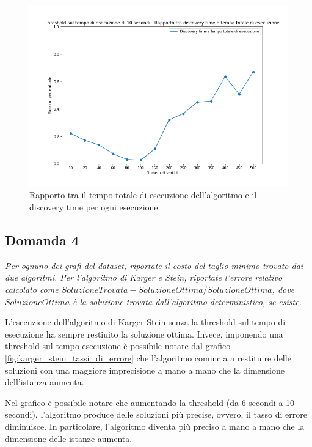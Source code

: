 \begin{figure}[H]
	\centering
	\includegraphics[width=1\textwidth]{res/images/single/karger-stein/discovery-time/threshold10/karger_stein_rapporto_discovery_time_total_time_threshold_10s.png}
	\caption{Rapporto tra il tempo totale di esecuzione dell'algoritmo 
	e il discovery time per ogni esecuzione.}
	\label{fig:karger_stein_rapporto_discovery_time_total_time_threshold_10s}
\end{figure}

\subsection{Domanda 4}
\textit{Per ognuno dei grafi del dataset, riportate il costo del taglio minimo trovato dai due algoritmi. Per l'algoritmo di Karger e Stein, riportate l'errore relativo calcolato come $SoluzioneTrovata-SoluzioneOttima/SoluzioneOttima$, dove $SoluzioneOttima$ è la soluzione trovata dall'algoritmo deterministico, se esiste.}

L'esecuzione dell'algoritmo di Karger-Stein senza la threshold sul 
tempo di esecuzione ha sempre restiuito la soluzione ottima. Invece, 
imponendo una threshold sul tempo esecuzione è possibile notare dal 
grafico \ref{fig:karger_stein_tassi_di_errore} che l'algoritmo 
comincia a restituire delle soluzioni con una maggiore imprecisione 
a mano a mano che la dimensione dell'istanza aumenta.

Nel grafico è possibile notare che aumentando la threshold 
(da 6 secondi a 10 secondi), l'algoritmo produce delle soluzioni più 
precise, ovvero, il tasso di errore diminuisce. In particolare, 
l'algoritmo diventa più preciso a mano a mano che la dimensione delle 
istanze aumenta.

